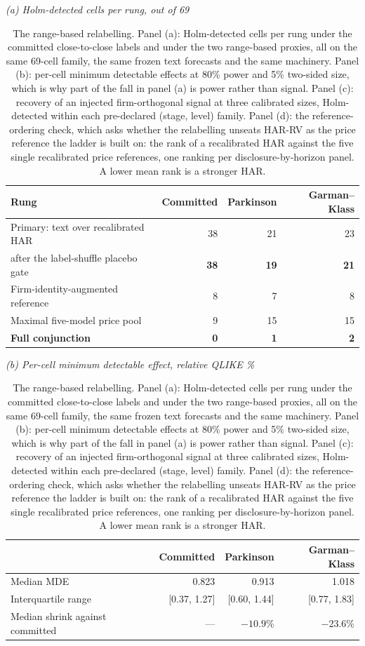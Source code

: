 \begin{table}[htbp]
\centering
\caption[The range-based relabelling: rungs, power and reference
ordering]{The range-based relabelling. Panel (a): Holm-detected cells per
rung under the committed close-to-close labels and under the two
range-based proxies, all on the same 69-cell family, the same frozen text
forecasts and the same machinery. Panel (b): per-cell minimum detectable
effects at 80\% power and 5\% two-sided size, which is why part of the fall
in panel (a) is power rather than signal. Panel (c): recovery of an
injected firm-orthogonal signal at three calibrated sizes, Holm-detected
within each pre-declared (stage, level) family. Panel (d): the
reference-ordering check, which asks whether the relabelling unseats HAR-RV
as the price reference the ladder is built on: the rank of a
recalibrated HAR against the five single recalibrated price references, one
ranking per disclosure-by-horizon panel. A lower mean rank is a stronger
HAR.}
\label{tab:app-rangebased}
\singlespacing\small
\setlength{\tabcolsep}{4pt}

\emph{(a) Holm-detected cells per rung, out of 69}\\[0.4ex]
\begin{tabular}{@{}lrrr@{}}
\toprule
Rung & Committed & Parkinson & Garman--Klass \\
\midrule
Primary: text over recalibrated HAR & 38 & 21 & 23 \\
\quad after the label-shuffle placebo gate & \textbf{38} & \textbf{19} & \textbf{21} \\
Firm-identity-augmented reference & 8 & 7 & 8 \\
Maximal five-model price pool & 9 & 15 & 15 \\
\textbf{Full conjunction} & \textbf{0} & \textbf{1} & \textbf{2} \\
\bottomrule
\end{tabular}

\vspace{1.2ex}
\emph{(b) Per-cell minimum detectable effect, relative QLIKE \%}\\[0.4ex]
\begin{tabular}{@{}lrrr@{}}
\toprule
& Committed & Parkinson & Garman--Klass \\
\midrule
Median MDE & 0.823 & 0.913 & 1.018 \\
Interquartile range & [0.37, 1.27] & [0.60, 1.44] & [0.77, 1.83] \\
Median shrink against committed & --- & $-10.9\%$ & $-23.6\%$ \\
\bottomrule
\end{tabular}


\end{table}
